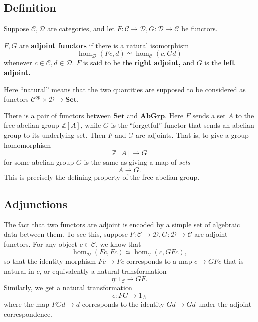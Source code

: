 \begin{proposition}
\subsection{Definition}

Suppose $\mathcal{C}, \mathcal{D}$ are categories, and let $F: \mathcal{C} \to
\mathcal{D}, G: \mathcal{D} \to \mathcal{C}$ be functors.

\begin{definition} 
$F, G$ are \textbf{adjoint functors} if there is a natural isomorphism
\[ \hom_{\mathcal{D}}(Fc, d) \simeq \hom_{\mathcal{C}}(c, Gd)  \]
whenever $c \in \mathcal{C}, d \in \mathcal{D}$. $F$ is said to be the
\textbf{right adjoint,} and $G$ is the \textbf{left adjoint.}
\end{definition} 

Here ``natural'' means that the two quantities are supposed to be considered
as functors $\mathcal{C}^{op} \times \mathcal{D} \to \mathbf{Set}$.

\begin{example} 
There is a pair of functors between $\mathbf{Set}$ and $\mathbf{AbGrp}$. Here
$F$ sends  a set $A$ to the free abelian group $\mathbb{Z}[A]$, while $G$ is
the ``forgetful'' functor that sends an abelian group to its underlying set. 
Then $F$ and $G$ are adjoints. That is, to give a group-homomorphism
\[ \mathbb{Z}[A] \to G  \]
for some abelian group $G$ 
is the same as giving a map of \emph{sets}
\[ A \to G.  \]
This is precisely the defining property of the free abelian group.
\end{example} 


\subsection{Adjunctions}

The fact that two functors are adjoint is encoded by a simple set of algebraic
data between them. 
To see this, suppose $F: \mathcal{C} \to \mathcal{D}, G: \mathcal{D} \to \mathcal{C}$ are
adjoint functors. 
For any object $c \in \mathcal{C}$, we know that
\[ \hom_{\mathcal{D}}(Fc, Fc) \simeq \hom_{\mathcal{C}}(c, GF c),  \]
so that the identity morphism $Fc \to Fc$ corresponds to a map $c \to GFc$
that is natural in $c$, or equivalently a natural
transformation
\[ \eta: 1_{\mathcal{C}} \to GF. \]
Similarly, we get a natural transformation
\[ \epsilon:  FG \to 1_{\mathcal{D}}  \]
where the map $FGd \to d$ corresponds to the identity $Gd \to Gd$ under the
adjoint correspondence.


\end{proposition}
